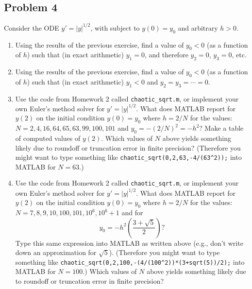 \documentclass{article}
\begin{document}
\subsection*{Problem 4}
Consider the ODE $y' = |y|^{1/2}$, with subject to $y(0) = y_0$ and arbitrary $h > 0$.
\begin{enumerate}
	\item Using the results of the previous exercise,
		find a value of $y_0 < 0$ (as a function of $h$)
		such that (in exact arithmetic) $y_1 = 0$,
		and therefore $y_2 = 0$, $y_3 = 0$, etc.
	\item Using the results of the previous exercise,
		find a value of $y_0 < 0$ (as a function of $h$) such that
		(in exact arithmetic) $y_1 < 0$ and $y_2 = y_3 = \cdots = 0$.
	\item Use the code from Homework 2 called \verb|chaotic_sqrt.m|,
		or implement your own Euler's method solver for $y' = |y|^{1/2}$.
		What does MATLAB report for $y(2)$ on the initial condition
		$y(0) = y_0$ where $h = 2/N$ for the values:
		$N = 2,4,16,64,65,63,99,100,101$ and $y_0 = -(2/N)^2 = -h^2$?
		Make a table of computed values of $y(2)$.
		Which values of $N$ above yields something likely due to roundoff
		or truncation error in finite precision?
		(Therefore you might want to type something like
		\verb|chaotic_sqrt(0,2,63,-4/(63^2));| into MATLAB for $N=63$.)
	\item Use the code from Homework 2 called \verb|chaotic_sqrt.m|,
		or implement your own Euler's method solver for $y' = |y|^{1/2}$.
		What does MATLAB report for $y(2)$ on the initial condition $y(0) = y_0$
		where $h = 2/N$ for the values: $N = 7,8,9,10,100,101,10^6,10^6+1$ and for
		\[
			y_0 = -h^2\left(\frac{3+\sqrt{5}}{2}\right)?
		\]
		Type this same expression into MATLAB as written above
		(e.g., don't write down an approximation for $\sqrt{5}$).
		(Therefore you might want to type something like
		\verb|chaotic_sqrt(0,2,100,-(4/(100^2))*(3+sqrt(5))/2);|
		into MATLAB for $N = 100$.)
		Which values of $N$ above yields something likely due to roundoff
		or truncation error in finite precision?
\end{enumerate}
\end{document}
